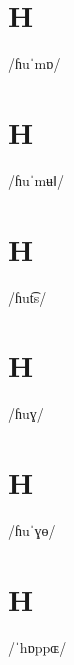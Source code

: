 \documentclass[10pt,a4paper,twoside]{book}
\begin{document}
\section*{H}

\begin{multicols}{3}
 {/ɦuˈmɒ/} {}
\end{multicols}

\section*{H}

\begin{multicols}{3}
 {/ɦuˈmʉǁ/} {}
\end{multicols}

\section*{H}

\begin{multicols}{3}
 {/ɦut͡s/} {}
\end{multicols}

\section*{H}

\begin{multicols}{3}
 {/ɦuɣ/} {}
\end{multicols}

\section*{H}

\begin{multicols}{3}
 {/ɦuˈɣɵ/} {}
\end{multicols}

\section*{H}

\begin{multicols}{3}
 {/ˈhɒppɶ/} {}
\end{multicols}
\end{document}
